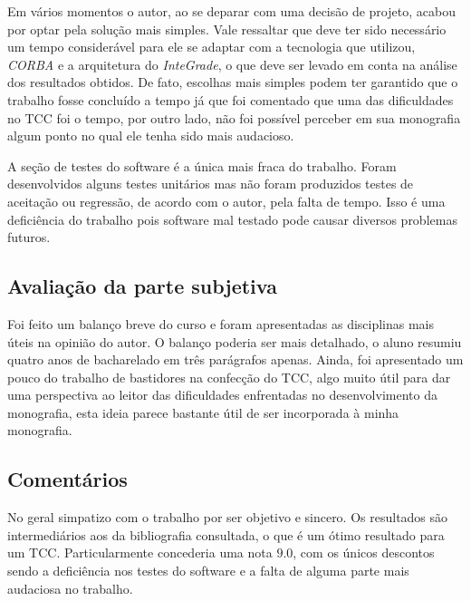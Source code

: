 \documentclass{article}
\begin{document}
	Em vários momentos o autor, ao se deparar com uma decisão de projeto, acabou por optar pela solução mais simples. Vale ressaltar que deve ter sido necessário um tempo considerável para ele se adaptar com a tecnologia que utilizou, \emph{CORBA} e a arquitetura do \emph{InteGrade}, o que deve ser levado em conta na análise dos resultados obtidos. De fato, escolhas mais simples podem ter garantido que o trabalho fosse concluído a tempo já que foi comentado que uma das dificuldades no TCC foi o tempo, por outro lado, não foi possível perceber em sua monografia algum ponto no qual ele tenha sido mais audacioso.
	
	A seção de testes do software é a única mais fraca do trabalho. Foram desenvolvidos alguns testes unitários mas não foram produzidos testes de aceitação ou regressão, de acordo com o autor, pela falta de tempo. Isso é uma deficiência do trabalho pois software mal testado pode causar diversos problemas futuros.
	
\subsection{Avaliação da parte subjetiva}
	Foi feito um balanço breve do curso e foram apresentadas as disciplinas mais úteis na opinião do autor. O balanço poderia ser mais detalhado, o aluno resumiu quatro anos de bacharelado em três parágrafos apenas. Ainda, foi apresentado um pouco do trabalho de bastidores na confecção do TCC, algo muito útil para dar uma perspectiva ao leitor das dificuldades enfrentadas no desenvolvimento da monografia, esta ideia parece bastante útil de ser incorporada à minha monografia. 
	
\subsection{Comentários}
	No geral simpatizo com o trabalho por ser objetivo e sincero. Os resultados são intermediários aos da bibliografia consultada, o que é um ótimo resultado para um TCC. Particularmente concederia uma nota $9.0$, com os únicos descontos sendo a deficiência nos testes do software e a falta de alguma parte mais audaciosa no trabalho.


%
%
\end{document}
